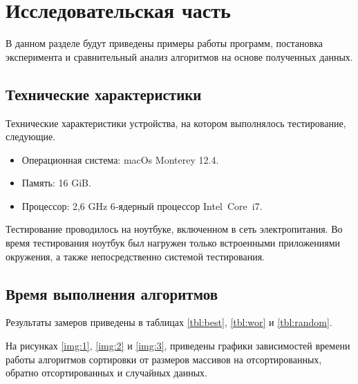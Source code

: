 \chapter{Исследовательская часть}

В данном разделе будут приведены примеры работы программ,
постановка эксперимента и сравнительный анализ алгоритмов на основе
полученных данных.

\section{Технические характеристики}

Технические характеристики устройства, на котором выполнялось тестирование,
следующие.

\begin{itemize}
	\item Операционная система: macOs Monterey 12.4\cite{ubuntu}.
	\item Память: 16 GiB.
	\item Процессор: 2,6 GHz 6‑ядерный процессор Intel Core i7\cite{intel}.
\end{itemize}

Тестирование проводилось на ноутбуке, включенном в сеть электропитания.
Во время тестирования ноутбук был нагружен только встроенными приложениями
окружения, а также непосредственно системой тестирования.

\section{Время выполнения алгоритмов}

Результаты замеров приведены в таблицах \ref{tbl:best}, \ref{tbl:wor} и \ref{tbl:random}.

На рисунках \ref{img:1}, \ref{img:2} и \ref{img:3}, приведены графики
зависимостей времени работы алгоритмов сортировки от размеров массивов
на отсортированных, обратно отсортированных и случайных данных.


